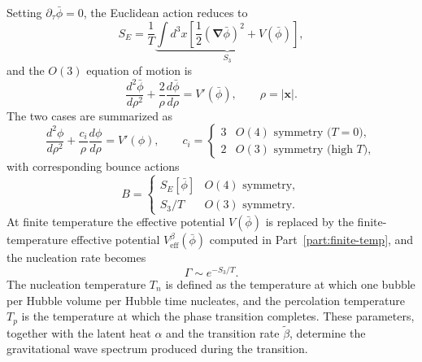 Setting $\partial_\tau\bar\phi = 0$, the Euclidean action reduces to
\begin{equation}
    S_E = \frac{1}{T}\underbrace{\int d^3x\left[
    \frac{1}{2}(\boldsymbol\nabla\bar\phi)^2
    + V(\bar\phi)\right]}_{S_3},
\end{equation}
and the $O(3)$ equation of motion is
\begin{equation}
    \frac{d^2\bar\phi}{d\rho^2}
    + \frac{2}{\rho}\frac{d\bar\phi}{d\rho} = V'(\bar\phi),
    \qquad \rho = |\mathbf{x}|.
\end{equation}
The two cases are summarized as
\begin{equation}
    \frac{d^2\phi}{d\rho^2} + \frac{c_i}{\rho}\frac{d\phi}{d\rho}
    = V'(\phi),
    \qquad c_i =
    \begin{cases}
        3 & O(4)\text{ symmetry (}T=0\text{)}, \\
        2 & O(3)\text{ symmetry (high }T\text{)},
    \end{cases}
\end{equation}
with corresponding bounce actions
\begin{equation}
    B = \begin{cases}
        S_E[\bar\phi] & O(4)\text{ symmetry}, \\
        S_3/T & O(3)\text{ symmetry}.
    \end{cases}
\end{equation}
At finite temperature the effective potential $V(\bar\phi)$ is
replaced by the finite-temperature effective potential
$V_{\text{eff}}^\beta(\bar\phi)$ computed in Part~\ref{part:finite-temp},
and the nucleation rate becomes
\begin{equation}
    \Gamma \sim e^{-S_3/T}.
\end{equation}
The nucleation temperature $T_n$ is defined as the temperature at
which one bubble per Hubble volume per Hubble time nucleates, and the
percolation temperature $T_p$ is the temperature at which the phase
transition completes. These parameters, together with the latent heat
$\alpha$ and the transition rate $\tilde\beta$, determine the
gravitational wave spectrum produced during the transition.

